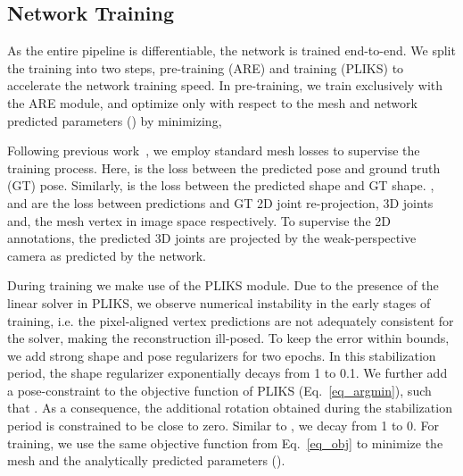 \documentclass[10pt,twocolumn,letterpaper]{article}
\begin{document}
\subsection{Network Training}
As the entire pipeline is differentiable, the network is trained end-to-end. We split the training into two steps, pre-training (ARE) and training (PLIKS) to accelerate the network training speed. In pre-training, we train exclusively with the ARE module, and optimize only with respect to the mesh and network predicted parameters () by minimizing,

Following previous work~\cite{hmr,spin,i2l}, we employ standard mesh losses to supervise the training process. Here,  is the  loss between the predicted pose and ground truth (GT) pose. Similarly,  is the  loss between the predicted shape and GT shape. ,  and  are the  loss between predictions and GT 2D joint re-projection, 3D joints and, the mesh vertex in image space respectively. To supervise the 2D annotations, the 
predicted 3D joints are projected by the weak-perspective camera   as predicted by the network. 

During training we make use of the PLIKS module. Due to the presence of the linear solver in PLIKS, we observe numerical instability in the early stages of training, i.e. the pixel-aligned vertex predictions are not adequately consistent for the solver, making the reconstruction ill-posed. To keep the error within bounds, we add strong shape and pose regularizers for two epochs. In this stabilization period, the shape regularizer   exponentially decays from 1 to 0.1. We further add a pose-constraint to the objective function of PLIKS (Eq.~\eqref{eq_argmin}), such that . As a consequence, the additional rotation  obtained during the stabilization period is constrained to be close to zero. Similar to , we decay  from 1 to 0. For training, we use the same objective function from  Eq.~\eqref{eq_obj} to minimize the mesh and the analytically predicted parameters ().
\end{document}
